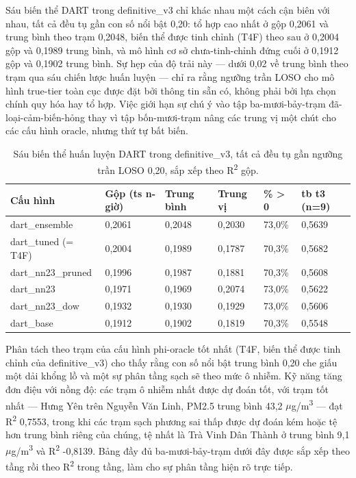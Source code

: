 Sáu biến thể DART trong definitive\_v3 chỉ khác nhau một cách cận biên với nhau, tất cả đều tụ gần con số nổi bật 0,20: tổ hợp cao nhất ở gộp 0,2061 và trung bình theo trạm 0,2048, biến thể được tinh chỉnh (T4F) theo sau ở 0,2004 gộp và 0,1989 trung bình, và mô hình cơ sở chưa-tinh-chỉnh đứng cuối ở 0,1912 gộp và 0,1902 trung bình. Sự hẹp của độ trải này --- dưới 0,02 về trung bình theo trạm qua sáu chiến lược huấn luyện --- chỉ ra rằng ngưỡng trần LOSO cho mô hình true-tier toàn cục được đặt bởi thông tin sẵn có, không phải bởi lựa chọn chính quy hóa hay tổ hợp. Việc giới hạn sự chú ý vào tập ba-mươi-bảy-trạm đã-loại-cảm-biến-hỏng thay vì tập bốn-mươi-trạm nâng các trung vị một chút cho các cấu hình oracle, nhưng thứ tự bất biến.

{\small
\begin{longtable}{llllll}
\caption{Sáu biến thể huấn luyện DART trong definitive\_v3, tất cả đều tụ gần ngưỡng trần LOSO 0,20, sắp xếp theo R\textsuperscript{2} gộp.}\\
\toprule
\textbf{Cấu hình} & \textbf{Gộp (ts n-giờ)} & \textbf{Trung bình} & \textbf{Trung vị} & \textbf{\% > 0} & \textbf{tb t3 (n=9)} \\
\midrule\endhead
dart\_ensemble & 0,2061 & 0,2048 & 0,2030 & 73,0\% & 0,5639 \\
dart\_tuned (= T4F) & 0,2004 & 0,1989 & 0,1787 & 70,3\% & 0,5682 \\
dart\_nn23\_pruned & 0,1996 & 0,1987 & 0,1881 & 70,3\% & 0,5608 \\
dart\_nn23 & 0,1971 & 0,1969 & 0,2074 & 73,0\% & 0,5622 \\
dart\_nn23\_dow & 0,1932 & 0,1930 & 0,1929 & 73,0\% & 0,5606 \\
dart\_base & 0,1912 & 0,1902 & 0,1819 & 70,3\% & 0,5548 \\
\bottomrule
\end{longtable}
}


Phân tách theo trạm của cấu hình phi-oracle tốt nhất (T4F, biến thể được tinh chỉnh của definitive\_v3) cho thấy rằng con số nổi bật trung bình 0,20 che giấu một dải khổng lồ và một sự phân tầng sạch sẽ theo mức ô nhiễm. Kỹ năng tăng đơn điệu với nồng độ: các trạm ô nhiễm nhất được dự đoán tốt, với trạm tốt nhất --- Hưng Yên trên Nguyễn Văn Linh, PM2.5 trung bình 43,2 $\mu$g/m\textsuperscript{3} --- đạt R\textsuperscript{2} 0,7553, trong khi các trạm sạch phương sai thấp được dự đoán kém hoặc tệ hơn trung bình riêng của chúng, tệ nhất là Trà Vinh Dân Thành ở trung bình 9,1 $\mu$g/m\textsuperscript{3} và R\textsuperscript{2} -0,8139. Bảng đầy đủ ba-mươi-bảy-trạm dưới đây được sắp xếp theo tầng rồi theo R\textsuperscript{2} trong tầng, làm cho sự phân tầng hiện rõ trực tiếp.

